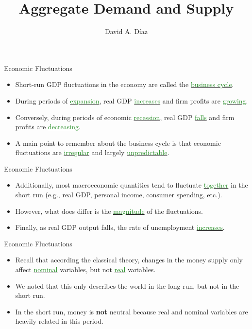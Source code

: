 \documentclass[xcolor={dvipsnames},pdf, hyperref={colorlinks=true, citecolor=ForestGreen, linkcolor=BlueViolet, urlcolor=Magenta}]{beamer}
\title{Aggregate Demand and Supply}
\author{David A. D\'iaz}
\institute{UNC Chapel Hill}
\date{}
\theoremstyle{definition}
\newcommand{\dd}[1]{{\underline{\textcolor{ForestGreen}{#1}}}}
\begin{document}
 
	
	\begin{frame}
		
		\titlepage
		
	\end{frame}

\begin{frame}{Economic Fluctuations}
\begin{itemize}
	\item Short-run GDP fluctuations in the economy are called the \dd{business cycle}. 
	\item During periods of \dd{expansion}, real GDP \dd{increases} and firm profits are \dd{growing}.
	\item Conversely, during periods of economic \dd{recession}, real GDP \dd{falls} and firm profits are \dd{decreasing}.
	\item A main point to remember about the business cycle is that economic fluctuations are \dd{irregular} and largely \dd{unpredictable}.
\end{itemize}
\end{frame}

\begin{frame}{Economic Fluctuations}
	\begin{itemize}
		\item Additionally, most macroeconomic quantities tend to fluctuate \dd{together} in the short run (e.g., real GDP, personal income, consumer spending, etc.). 
		\item However, what does differ is the \dd{magnitude} of the fluctuations.
		\item Finally, as real GDP output falls, the rate of unemployment \dd{increases}. 
	\end{itemize}
\end{frame}

\begin{frame}{Economic Fluctuations}
	\begin{itemize}
		\item Recall that according the classical theory, changes in the money supply only affect \dd{nominal} variables, but not \dd{real} variables. 
		\item We noted that this only describes the world in the long run, but not in the short run.
		\item  In the short run, money is \textbf{not} neutral because real and nominal variables are heavily related in this period. 
	\end{itemize}
\end{frame}
\end{document}
